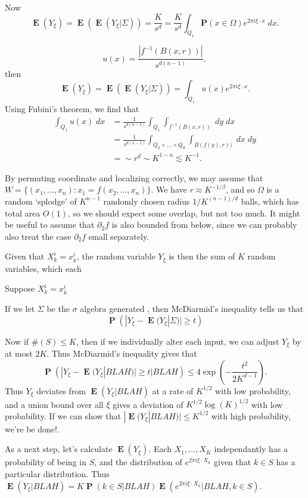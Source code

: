 \documentclass[12pt,reqno]{article}
\numberwithin{equation}{section}
\DeclareMathOperator{\EE}{\mathbf{E}}
\DeclareMathOperator{\PP}{\mathbf{P}}
\begin{document}
Now
%
\[ \EE(Y_\xi) = \EE(\EE(Y_\xi | \Sigma)) = \frac{K}{s^d} = \frac{K}{s^d} \int_{Q_1} \mathbf{P}(x \in \Omega) e^{2 \pi i \xi \cdot x}\; dx. \]


%
\[ u(x) = \frac{|f^{-1}(B(x,r))|}{s^{d(n-1)}}, \]
%
then
%
\[ \EE(Y_\xi) = \EE(\EE(Y_\xi | \Sigma)) = \int_{Q_1} u(x) e^{2 \pi i \xi \cdot x}. \]
%
Using Fubini's theorem, we find that
%
\begin{align*}
    \int_{Q_1} u(x)\; dx &= \frac{1}{s^{d(n-1)}} \int_{Q_1} \int_{f^{-1}(B(x,r))}\; dy\; dx\\
    &= \frac{1}{s^{d(n-1)}} \int_{Q_2 \times \dots \times Q_d} \int_{B(f(y),r))}\; dx\; dy\\
    &= 
    \sim r^d \sim K^{1-n} \lesssim K^{-1}.
\end{align*}



By permuting coordinate and localizing correctly, we may assume that $W = \{ (x_1,\dots,x_n): x_1 = f(x_2,\dots,x_n) \}$. We have $r \approx K^{-1/\beta}$, and so $\Omega$ is a random `splodge' of $K^{n-1}$ randomly chosen radius $1/K^{(n-1)/d}$ balls, which has total area $O(1)$, so we should expect some overlap, but not too much. It might be useful to assume that $\partial_2 f$ is also bounded from below, since we can probably also treat the case $\partial_2 f$ small separately.

 Given that $X^i_k = x^i_k$, the random variable $Y_\xi$ is then the sum of $K$ random variables, which each 

Suppose $X^i_k = x^i_k$

If we let $\Sigma$ be the $\sigma$ algebra generated , then McDiarmid's inequality tells us that
%
\[ \PP \left( |Y_\xi - \EE(Y_\xi | \Sigma)| \geq t \right) \]
%

Now if $\#(S) \leq K$, then if we individually alter each input, we can adjust $Y_\xi$ by at most $2K$. Thus McDiarmid's inequality gives that
%
\[ \PP \left( |Y_\xi - \EE(Y_\xi|BLAH)| \geq t | BLAH \right) \leq 4 \exp \left(- \frac{t^2}{2K^{d-1}} \right). \]
%
Thus $Y_\xi$ deviates from $\EE(Y_\xi|BLAH)$ at a rate of $K^{1/2}$ with low probability, and a union bound over all $\xi$ gives a deviation of $K^{1/2} \log(K)^{1/2}$ with low probability. If we can show that $|\EE(Y_\xi|BLAH)| \leq K^{1/2}$ with high probability, we're be done!.

As a next step, let's calculate $\EE(Y_\xi)$. Each $X_1, \dots, X_K$ independantly has a probability of being in $S$, and the distribution of $e^{2 \pi i \xi \cdot X_k}$ given that $k \in S$ has a particular distribution. Thus $\EE(Y_\xi|BLAH) = K \PP(k \in S|BLAH) \EE(e^{2 \pi i \xi \cdot X_k}|BLAH, k \in S)$.
\end{document}
